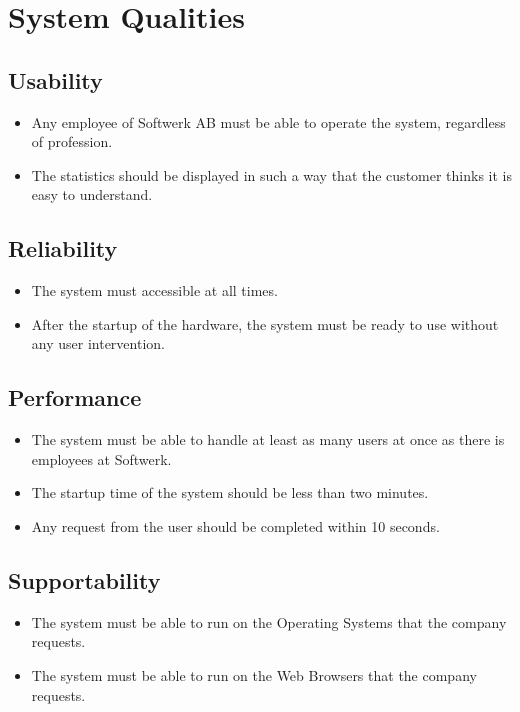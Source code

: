 \section{System Qualities}

\subsection{Usability}

\begin{itemize}
\item Any employee of Softwerk AB must be able to operate the system, regardless of profession.
\item The statistics should be displayed in such a way that the customer thinks it is easy to understand.
\end{itemize}

\subsection{Reliability}

\begin{itemize}
\item The system must accessible at all times.
\item After the startup of the hardware, the system must be ready to use without any user intervention.
\end{itemize}

\subsection{Performance}

\begin{itemize}
\item The system must be able to handle at least as many users at once as there is employees at Softwerk.
\item The startup time of the system should be less than two minutes.
\item Any request from the user should be completed within 10 seconds.
\end{itemize}

\subsection{Supportability}

\begin{itemize}
\item The system must be able to run on the Operating Systems that the company requests.
\item The system must be able to run on the Web Browsers that the company requests.
\end{itemize}



